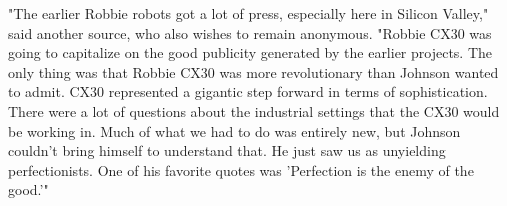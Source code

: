 "The earlier Robbie robots got a lot of press, especially here in Silicon Valley," said another source, who also wishes to remain anonymous. "Robbie CX30 was going to capitalize on the good publicity generated by the earlier projects. The only thing was that Robbie CX30 was more revolutionary than Johnson wanted to admit. CX30 represented a gigantic step forward in terms of sophistication. There were a lot of questions about the industrial settings that the CX30 would be working in. Much of what we had to do was entirely new, but Johnson couldn't bring himself to understand that. He just saw us as unyielding perfectionists. One of his favorite quotes was 'Perfection is the enemy of the good.'"
